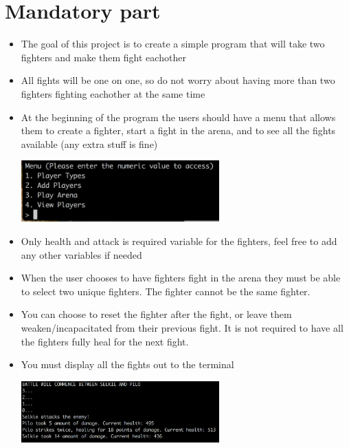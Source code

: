 \documentclass{42-en}
\begin{document}
\chapter{Mandatory part}

	\begin{itemize}
		\item The goal of this project is to create a simple program
		that will take two fighters and make them fight eachother
		\item All fights will be one on one, so do not worry about having
		more than two fighters fighting eachother at the same time
		\item At the beginning of the program the users should have a menu
		that allows them to create a fighter, start a fight in the arena,
		and to see all the fights available (any extra stuff is fine)

	\begin{center}
		\includegraphics[width=0.6\textwidth]{images/menu.png}
	\end{center}

		\item Only health and attack is required variable for the fighters,
		feel free to add any other variables if needed
		\item When the user chooses to have fighters fight in the arena
		they must be able to select two unique fighters. The fighter cannot
		be the same fighter.
		\item You can choose to reset the fighter after the fight, or leave
		them weaken/incapacitated from their previous fight. It is not required
		to have all the fighters fully heal for the next fight.
		\item You must display all the fights out to the terminal

	\begin{center}
		\includegraphics[width=0.6\textwidth]{images/fight.png}
	\end{center}


\end{itemize}
\end{document}
